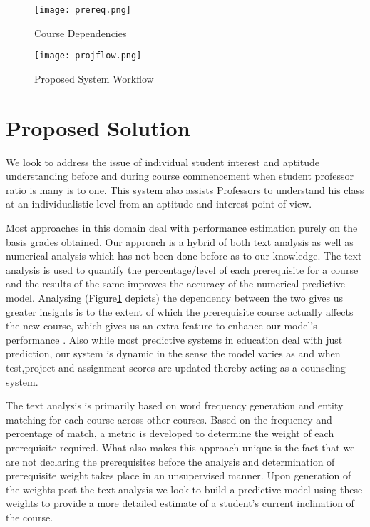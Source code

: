 \documentclass[conference]{IEEEtran}
\begin{document}
\begin{figure}
	\texttt{[image: prereq.png]}
	\caption{Course Dependencies}
	\label{fig:prereq}
\end{figure}
\begin{figure}
	\texttt{[image: projflow.png]}
	\caption{Proposed System Workflow}
	\label{fig:projflow}
\end{figure}

	\section{Proposed Solution}
We look to address the issue of individual student interest and aptitude understanding before and during course commencement when student professor ratio is many is to one. This system also assists Professors to understand his class at an individualistic level from an aptitude and interest point of view. 

Most approaches in this domain deal with performance estimation purely on the basis grades obtained. Our approach is a hybrid of both text analysis as well as numerical analysis which has not been done before as to our knowledge. The text analysis is used to quantify the percentage/level of each prerequisite for a course and the results of the same improves the accuracy of the numerical predictive model. Analysing (Figure\ref{fig:prereq} depicts) the dependency between the two gives us greater insights is to the extent of which the prerequisite course actually affects the new course, which gives us an extra feature to enhance our model's performance . Also while most predictive systems in education deal with just prediction, our system is dynamic in the sense the model varies as and when test,project and assignment scores are updated thereby acting as a counseling system.

The text analysis is primarily based on word frequency generation and entity matching for each course across other courses. Based on the frequency and percentage of match, a metric is developed to determine the weight of each prerequisite required. What also makes this approach unique is the fact that we are not declaring the prerequisites before the analysis and determination of prerequisite weight takes place in an unsupervised manner. Upon generation of the weights post the text analysis we look to build a predictive model using these weights to provide a more detailed estimate of a student's current inclination of the course.
\end{document}
